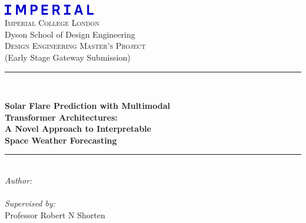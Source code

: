 \begin{titlepage}
\begin{center}

\vspace*{1.5cm}

\includegraphics[width=4cm]{./figures/Imperial_College_London_new_logo}\\[1cm]

{\scshape\Large Imperial College London}\\[0.3cm]
{\Large Dyson School of Design Engineering}\\[1.5cm]

{\scshape\LARGE Design Engineering Master’s Project}\\[0.5cm]
{\Large (Early Stage Gateway Submission)}\\[0.5cm]

\rule{\linewidth}{0.5mm}\\[0.2cm] %

\begin{center}
{\Large \bfseries Solar Flare Prediction with Multimodal \\[0.1cm]
Transformer Architectures: \\[0.1cm]
A Novel Approach to Interpretable \\[0.5cm]
Space Weather Forecasting}
\end{center}

\rule{\linewidth}{0.5mm}\\[0.5cm] %
{\Large \textit{Author:}}\\[0.2cm]
{\Large \reportauthor}\\[0.5cm]

{\Large \textit{Supervised by:}}\\[0.2cm]
{\Large Professor Robert N Shorten}\\[0.5cm]


\end{center}
\end{titlepage}
